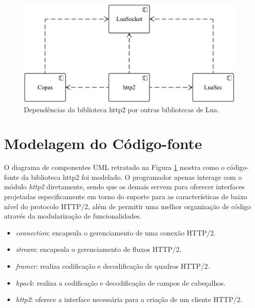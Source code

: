 \begin{figure}[hbt!]
 \centering
  \includegraphics[width=\textwidth]{./fig/deps}
 \caption{Dependências da biblioteca http2 por outras bibliotecas de Lua.}
 \label{fig:deps}
\end{figure}

\section{Modelagem do Código-fonte}
\label{sec:components}

O diagrama de componentes UML retratado na Figura \ref{fig:deps} mostra como o código-fonte da biblioteca http2 foi modelado. O programador apenas interage com o módulo {\em http2} diretamente, sendo que os demais servem para oferecer interfaces projetadas especificamente em torno do suporte para as características de baixo nível do protocolo HTTP/2, além de permitir uma melhor organização de código através da modularização de funcionalidades.

\begin{itemize}
    \item {\em connection}: encapsula o gerenciamento de uma conexão HTTP/2.
    \item {\em stream}: encapsula o gerenciamento de fluxos HTTP/2.
    \item {\em framer}: realiza codificação e decodificação de quadros HTTP/2.
    \item {\em hpack}: realiza a codificação e decodificação de campos de cabeçalhos.
    \item {\em http2}: oferece a interface necessária para a criação de um cliente HTTP/2.
\end{itemize}

